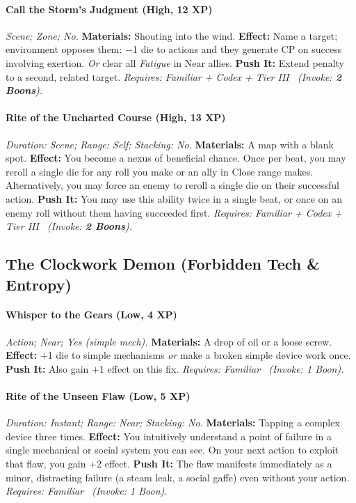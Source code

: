 \documentclass[12pt,twoside]{book}
\begin{document}
\paragraph{Call the Storm's Judgment (High, 12 XP)} \emph{Scene; Zone; No.}
\textbf{Materials:} Shouting into the wind.
\textbf{Effect:} Name a target; environment opposes them: −1 die to actions and they generate CP on success involving exertion. \emph{Or} clear all \emph{Fatigue} in Near allies.
\textbf{Push It:} Extend penalty to a second, related target.
\emph{Requires: Familiar + Codex + Tier III \ (\textit{Invoke:} \textbf{2 Boons}).}
\paragraph{Rite of the Uncharted Course (High, 13 XP)} \emph{Duration: Scene; Range: Self; Stacking: No.}
\textbf{Materials:} A map with a blank spot.
\textbf{Effect:} You become a nexus of beneficial chance. Once per beat, you may reroll a single die for any roll you make or an ally in Close range makes. Alternatively, you may force an enemy to reroll a single die on their successful action.
\textbf{Push It:} You may use this ability twice in a single beat, or once on an enemy roll without them having succeeded first.
\emph{Requires: Familiar + Codex + Tier III \ (\textit{Invoke:} \textbf{2 Boons}).}

\subsection{The Clockwork Demon (Forbidden Tech \& Entropy)}
\paragraph{Whisper to the Gears (Low, 4 XP)} \emph{Action; Near; Yes (simple mech).}
\textbf{Materials:} A drop of oil or a loose screw.
\textbf{Effect:} +1 die to simple mechanisms \emph{or} make a broken simple device work once.
\textbf{Push It:} Also gain +1 effect on this fix.
\emph{Requires: Familiar \ (\textit{Invoke:} 1 Boon).}
\paragraph{Rite of the Unseen Flaw (Low, 5 XP)} \emph{Duration: Instant; Range: Near; Stacking: No.}
\textbf{Materials:} Tapping a complex device three times.
\textbf{Effect:} You intuitively understand a point of failure in a single mechanical or social system you can see. On your next action to exploit that flaw, you gain +2 effect.
\textbf{Push It:} The flaw manifests immediately as a minor, distracting failure (a steam leak, a social gaffe) even without your action.
\emph{Requires: Familiar \ (\textit{Invoke:} 1 Boon).}
\end{document}
